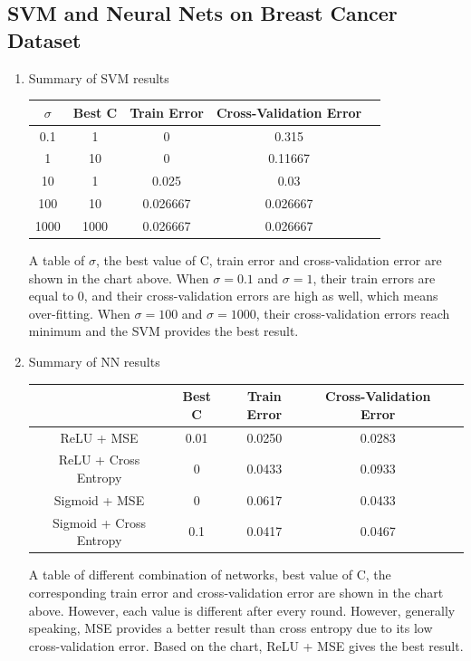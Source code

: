 \documentclass[english]{article}
\begin{document}
\subsection{SVM and Neural Nets on Breast Cancer Dataset}
\begin{enumerate}
    \item Summary of SVM results\\
    \begin{center}
      \begin{tabular}{|c |c |c |c| c|}
      \hline
      $\sigma$ & Best C & Train Error & Cross-Validation Error\\ [1ex]
      \hline
      0.1   &      1       &     0   &0.315\\[2ex]
      \hline
      1     &   10    &        0    &0.11667\\[2ex]
      \hline
      10   &      1    &    0.025     &0.03\\[2ex]
      \hline
      100     &   10  &   0.026667  &0.026667\\[2ex]
      \hline
      1000   &   1000  &   0.026667   &0.026667\\[2ex]
      \hline
      \end{tabular}
    \end{center}
    A table of $\sigma$, the best value of C, train error and cross-validation error are shown in the chart above. When $\sigma = 0.1$ and $\sigma = 1$, their train errors are equal to 0, and their cross-validation errors are high as well, which means over-fitting. When $\sigma = 100$ and $\sigma = 1000$, their cross-validation errors reach minimum and the SVM provides the best result.
    \item Summary of NN results
    \begin{center}
      \begin{tabular}{|c |c |c |c| c|}
      \hline
      & Best C & Train Error & Cross-Validation Error\\ [1ex]
      \hline
      ReLU + MSE  & 0.01&     0.0250       &     0.0283\\[2ex]
      \hline
      ReLU + Cross Entropy   &0 &   0.0433    &       0.0933\\[2ex]
      \hline
      Sigmoid + MSE   & 0&     0.0617    &    0.0433     \\[2ex]
      \hline
      Sigmoid + Cross Entropy &0.1    &   0.0417  &   0.0467\\[2ex]
      \hline
      \end{tabular}
    \end{center}
    A table of different combination of networks, best value of C, the corresponding train error and cross-validation error are shown in the chart above. However, each value is different after every round. However, generally speaking, MSE provides a better result than cross entropy due to its low cross-validation error. Based on the chart, ReLU + MSE gives the best result.
\end{enumerate}
\clearpage
\end{document}
